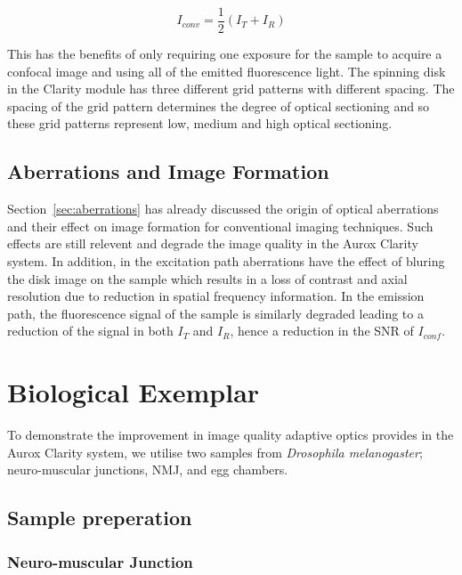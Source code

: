 \begin{equation}\label{eq:conventional_image}
I_{conv} = \frac{1}{2}\left(I_{T} + I_{R}\right)
\end{equation}

This has the benefits of only requiring one exposure for 
the sample to acquire a confocal image and using all of 
the emitted fluorescence light. The spinning disk in the 
Clarity module has three different grid patterns with 
different spacing. The spacing of the grid pattern determines
the degree of optical sectioning and so these grid patterns
represent low, medium and high optical sectioning.\cite{neil1997method}

\subsection{Aberrations and Image Formation}
\label{subsec:Aurox_aberrations}

Section~\ref{sec:aberrations} has already discussed the origin of 
optical aberrations and their effect on image formation for 
conventional imaging techniques. Such effects are still relevent
and degrade the image quality in the Aurox Clarity system. In addition,
in the excitation path aberrations have the effect of bluring the 
disk image on the sample which results in a loss of contrast and 
axial resolution due to reduction in spatial frequency
information.\cite{wilson1990confocal, hell1993aberrations} In the 
emission path, the fluorescence signal of the sample is similarly
degraded leading to a reduction of the signal in both $I_{T}$ and
$I_{R}$, hence a reduction in the SNR of $I_{conf}$. 

\section{Biological Exemplar}
\label{sec:Aurox_biology}

To demonstrate the improvement in image quality adaptive optics
provides in the Aurox Clarity system, we utilise two samples from
\textit{Drosophila melanogaster}; neuro-muscular junctions, NMJ, 
and egg chambers.

\subsection{Sample preperation}
\label{subsec:Aurox_sample_prep}

\subsubsection{Neuro-muscular Junction}
\label{subsubsec:Aurox_NMJ_prep}

